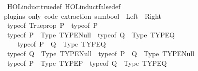 \begin{isabellebody}
\ \ HOL{\isachardot}{\kern0pt}induct{\isacharunderscore}{\kern0pt}true{\isacharunderscore}{\kern0pt}def\ HOL{\isachardot}{\kern0pt}induct{\isacharunderscore}{\kern0pt}false{\isacharunderscore}{\kern0pt}def\isanewline
\isanewline
{}\isamarkupfalse%
\ {\isacharparenleft}{\kern0pt}plugins\ only{\isacharcolon}{\kern0pt}\ code\ extraction{\isacharparenright}{\kern0pt}\ sumbool\ {\isacharequal}{\kern0pt}\ Left\ {\isacharbar}{\kern0pt}\ Right%
\isadelimdocument
%
\endisadelimdocument
%
\isatagdocument
%
\isamarkuptrue%
%
\endisatagdocument
{\isafolddocument}%
%
\isadelimdocument
%
\endisadelimdocument
{}\isamarkupfalse%
\isanewline
\ \ {\isachardoublequoteopen}typeof\ {\isacharparenleft}{\kern0pt}Trueprop\ P{\isacharparenright}{\kern0pt}\ {\isasymequiv}\ typeof\ P{\isachardoublequoteclose}\isanewline
\isanewline
\ \ {\isachardoublequoteopen}typeof\ P\ {\isasymequiv}\ Type\ {\isacharparenleft}{\kern0pt}TYPE{\isacharparenleft}{\kern0pt}Null{\isacharparenright}{\kern0pt}{\isacharparenright}{\kern0pt}\ {\isasymLongrightarrow}\ typeof\ Q\ {\isasymequiv}\ Type\ {\isacharparenleft}{\kern0pt}TYPE{\isacharparenleft}{\kern0pt}{\isacharprime}{\kern0pt}Q{\isacharparenright}{\kern0pt}{\isacharparenright}{\kern0pt}\ {\isasymLongrightarrow}\isanewline
\ \ \ \ \ typeof\ {\isacharparenleft}{\kern0pt}P\ {\isasymlongrightarrow}\ Q{\isacharparenright}{\kern0pt}\ {\isasymequiv}\ Type\ {\isacharparenleft}{\kern0pt}TYPE{\isacharparenleft}{\kern0pt}{\isacharprime}{\kern0pt}Q{\isacharparenright}{\kern0pt}{\isacharparenright}{\kern0pt}{\isachardoublequoteclose}\isanewline
\isanewline
\ \ {\isachardoublequoteopen}typeof\ Q\ {\isasymequiv}\ Type\ {\isacharparenleft}{\kern0pt}TYPE{\isacharparenleft}{\kern0pt}Null{\isacharparenright}{\kern0pt}{\isacharparenright}{\kern0pt}\ {\isasymLongrightarrow}\ typeof\ {\isacharparenleft}{\kern0pt}P\ {\isasymlongrightarrow}\ Q{\isacharparenright}{\kern0pt}\ {\isasymequiv}\ Type\ {\isacharparenleft}{\kern0pt}TYPE{\isacharparenleft}{\kern0pt}Null{\isacharparenright}{\kern0pt}{\isacharparenright}{\kern0pt}{\isachardoublequoteclose}\isanewline
\isanewline
\ \ {\isachardoublequoteopen}typeof\ P\ {\isasymequiv}\ Type\ {\isacharparenleft}{\kern0pt}TYPE{\isacharparenleft}{\kern0pt}{\isacharprime}{\kern0pt}P{\isacharparenright}{\kern0pt}{\isacharparenright}{\kern0pt}\ {\isasymLongrightarrow}\ typeof\ Q\ {\isasymequiv}\ Type\ {\isacharparenleft}{\kern0pt}TYPE{\isacharparenleft}{\kern0pt}{\isacharprime}{\kern0pt}Q{\isacharparenright}{\kern0pt}{\isacharparenright}{\kern0pt}\ {\isasymLongrightarrow}\isanewline

\end{isabellebody}
